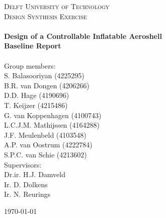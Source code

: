 \begin{titlepage}
\begin{center}

\textsc{\LARGE Delft University of Technology}\\[0.3cm]
\textsc{\Large Design Synthesis Exercise}\\[0.5cm]

\HRule \\[0.4cm]
{\Large \bfseries Design of a Controllable Inflatable Aeroshell}\\[0.2cm]
{\Huge \bfseries Baseline Report}\\[0.2cm]
\HRule \\[9cm]


Group members: \\[0.2cm]
S. Balasooriyan (4225295) \\
B.R. van Dongen (4206266) \\
D.D. Hage (4190696) \\
T. Keijzer (4215486) \\
G. van Koppenhagen (4100743) \\
L.C.J.M. Mathijssen (4164288) \\
J.F. Meulenbeld (4103548) \\
A.P. van Oostrum (4222784) \\
S.P.C. van Schie (4213602) \\[0.5cm]

Supervisors: \\[0.2cm]
Dr.ir. H.J. Damveld \\
Ir. D. Dolkens \\
Ir. N. Reurings \\



\vfill

\begin{large}\today \end{large}

\end{center}
\end{titlepage}